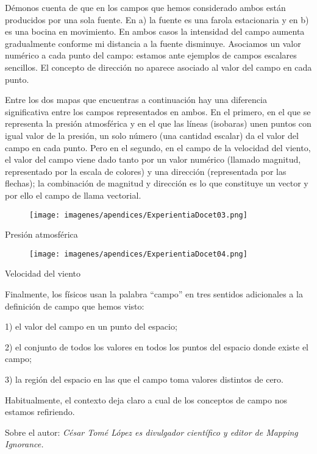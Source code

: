 Démonos cuenta de que en los campos que hemos considerado ambos están producidos por una sola fuente. En a) la fuente es una farola estacionaria y en b) es una bocina en movimiento. En ambos casos la intensidad del campo aumenta gradualmente conforme mi distancia a la fuente disminuye. Asociamos un valor numérico a cada punto del campo: estamos ante ejemplos de campos escalares sencillos. El concepto de dirección no aparece asociado al valor del campo en cada punto.

Entre los dos mapas que encuentras a continuación hay una diferencia significativa entre los campos representados en ambos. En el primero, en el que se representa la presión atmosférica y en el que las líneas (isobaras) unen puntos con igual valor de la presión, un solo número (una cantidad escalar) da el valor del campo en cada punto. Pero en el segundo, en el campo de la velocidad del viento, el valor del campo viene dado tanto por un valor numérico (llamado magnitud, representado por la escala de colores) y una dirección (representada por las flechas); la combinación de magnitud y dirección es lo que constituye un vector y por ello el campo de llama vectorial.
	
	
	\begin{multicols}{2}
	\begin{figure}[H]
	\centering
	\texttt{[image: imagenes/apendices/ExperientiaDocet03.png]}
	\end{figure}
	Presión atmosférica
	\begin{figure}[H]
	\centering
	\texttt{[image: imagenes/apendices/ExperientiaDocet04.png]}
	\end{figure}
	Velocidad del viento	
	\end{multicols}





Finalmente, los físicos usan la palabra “campo” en tres sentidos adicionales a la definición de campo que hemos visto:

1) el valor del campo en un punto del espacio;

2) el conjunto de todos los valores en todos los puntos del espacio donde existe el campo;

3) la región del espacio en las que el campo toma valores distintos de cero.

Habitualmente, el contexto deja claro a cual de los conceptos de campo nos estamos refiriendo.

\vspace{4mm} \textcolor{gris}{Sobre el autor: \emph {César Tomé López es divulgador científico y editor de Mapping Ignorance.}}

